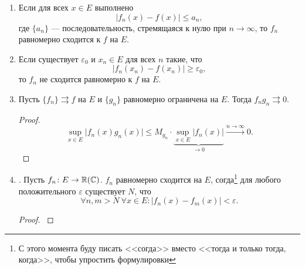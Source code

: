 \begin{prop}
\begin{enumerate}
		\item Если для всех $ x \in E$ выполнено
			$$ \lvert f_n(x) - f(x) \rvert \le a_n,$$
			где $ \{a_n\}$ --- последовательность, стремящаяся к нулю при $ n \to  \infty$, то $ f_n$ равномерно сходится к $ f$ на $ E$.
		\item Если существует $ \varepsilon_0$ и $ x_n \in E$ для всех $ n$ такие, что
			\[
				\lvert f_n(x_n) - f(x_n) \rvert \ge \varepsilon_0
			,\]
			то $ f_n$ не сходится равномерно к $ f$ на $ E$.
		\item Пусть $ \{f_n\} \rightrightarrows f$ на $ E$ и $ \{g_n\}$ равномерно ограничена на $E $. Тогда $ f_ng_n \rightrightarrows 0$.
			\begin{proof}
				\[
					\sup_{x \in E}\lvert f_n(x)g_n(x) \rvert \le M_{g_n} \cdot \underbrace{\sup_{x \in  E}\lvert f_n(x) \rvert }_{ \to 0} \stackrel{n \to \infty} \longrightarrow 0
				.\]
			\end{proof}
		\item {}. Пусть $ f_n \colon E \to  \mathbb{R}(\mathbb{C})$. $ f_n$ равномерно сходится на $ E$, согда\footnote{С этого момента буду писать <<согда>> вместо <<тогда и только тогда, когда>>, чтобы упростить формулировки} для любого положительного $ \varepsilon $ существует $ N$, что
			\[
				\forall n, m > N ~ \forall x \in  E \colon \lvert f_n(x) - f_m(x) \rvert < \varepsilon
			.\]
			\begin{proof}
				$ $
\end{proof}
\end{enumerate}
\end{prop}
